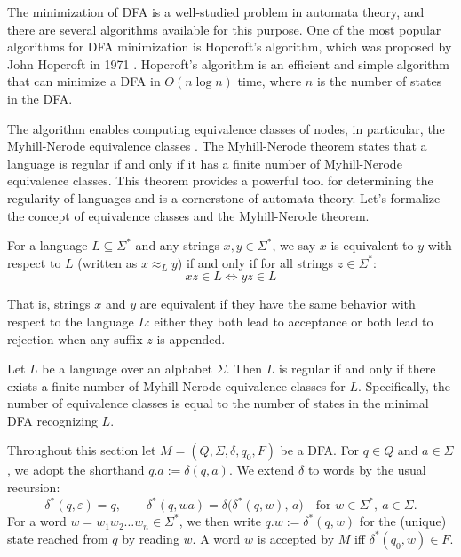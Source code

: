 The minimization of DFA is a well-studied problem in automata theory, and there are several algorithms available for this purpose. One of the most popular algorithms for DFA minimization is Hopcroft's algorithm, which was proposed by John Hopcroft in 1971 \cite{HOPCROFT1971189}. Hopcroft's algorithm is an efficient and simple algorithm that can minimize a DFA in $O(n \log n)$ time, where $n$ is the number of states in the DFA.

The algorithm enables computing equivalence classes of nodes, in particular, the Myhill-Nerode equivalence classes \cite{nerode1958linear, myhill1957finite}. The Myhill-Nerode theorem states that a language is regular if and only if it has a finite number of Myhill-Nerode equivalence classes. This theorem provides a powerful tool for determining the regularity of languages and is a cornerstone of automata theory. Let's formalize the concept of equivalence classes and the Myhill-Nerode theorem.

\begin{definition}
    For a language $L \subseteq \Sigma^*$ and any strings $x,y \in \Sigma^*$, we say $x$ is equivalent to $y$ with respect to $L$ (written as $x \approx_L y$) if and only if for all strings $z \in \Sigma^*$:
    \[ xz \in L \Leftrightarrow yz \in L \]
\end{definition}
That is, strings $x$ and $y$ are equivalent if they have the same behavior with respect to the language $L$: either they both lead to acceptance or both lead to rejection when any suffix $z$ is appended.

\begin{theorem} \label{def:myhill-nerode}
    Let $L$ be a language over an alphabet $\Sigma$. Then $L$ is regular if and only if there exists a finite number of Myhill-Nerode equivalence classes for $L$. Specifically, the number of equivalence classes is equal to the number of states in the minimal DFA recognizing $L$.
\end{theorem}

Throughout this section let $M = (Q, \Sigma, \delta, q_0, F)$ be a DFA. For $q \in Q$ and $a \in \Sigma$, we adopt the shorthand $q.a := \delta(q,a)$. We extend $\delta$ to words by the usual recursion:
\[
\delta^{*}(q,\varepsilon) = q, \qquad
\delta^{*}(q,wa) = \delta\bigl(\delta^{*}(q,w),\, a\bigr) \quad \text{for } w \in \Sigma^{*},\ a \in \Sigma .
\]
For a word $w = w_1 w_2 \dots w_n \in \Sigma^{*}$, we then write $q.w := \delta^{*}(q,w)$ for the (unique) state reached from $q$ by reading $w$. A word $w$ is accepted by $M$ iff $\delta^{*}(q_0,w) \in F$.

